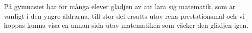 \textcolor{lila}{        
    På gymnasiet har för många elever glädjen av att lära sig matematik, som är vanligt i den yngre åldrarna, till stor del ersatts utav rena prestationsmål \cite{Skolverket03} och vi hoppas kunna visa en annan sida utav matematiken som väcker den glädjen igen.}
   
        

